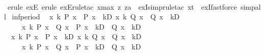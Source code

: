 \begin{isabellebody}
%
\isadelimproof
\ \ %
\endisadelimproof
%
\isatagproof
{}\isamarkupfalse%
\ {\isacharparenleft}{\kern0pt}{\isacharparenleft}{\kern0pt}erule\ exE{\isacharcomma}{\kern0pt}\ erule\ exE{\isacharcomma}{\kern0pt}rule{\isacharunderscore}{\kern0pt}tac\ x{\isacharequal}{\kern0pt}{\isachardoublequoteopen}max\ z\ za{\isachardoublequoteclose}\ \ exI{\isacharcomma}{\kern0pt}simp{\isacharparenright}{\kern0pt}{\isacharplus}{\kern0pt}{\isacharcomma}{\kern0pt}{\isacharparenleft}{\kern0pt}rule{\isacharunderscore}{\kern0pt}tac\ x{\isacharequal}{\kern0pt}{\isachardoublequoteopen}t{\isachardoublequoteclose}\ \ exI{\isacharcomma}{\kern0pt}fastforce{\isacharparenright}{\kern0pt}{\isacharplus}{\kern0pt}{\isacharparenright}{\kern0pt}\ simp{\isacharunderscore}{\kern0pt}all%
\endisatagproof
{\isafoldproof}%
%
\isadelimproof
\isanewline
%
\endisadelimproof
\isanewline
{}\isamarkupfalse%
\ inf{\isacharunderscore}{\kern0pt}period{\isacharcolon}{\kern0pt}\isanewline
\ \ {\isachardoublequoteopen}{\isasymlbrakk}{\isasymforall}x\ k{\isachardot}{\kern0pt}\ P\ x\ {\isacharequal}{\kern0pt}\ P\ {\isacharparenleft}{\kern0pt}x\ {\isacharminus}{\kern0pt}\ k{\isacharasterisk}{\kern0pt}D{\isacharparenright}{\kern0pt}{\isacharsemicolon}{\kern0pt}\ {\isasymforall}x\ k{\isachardot}{\kern0pt}\ Q\ x\ {\isacharequal}{\kern0pt}\ Q\ {\isacharparenleft}{\kern0pt}x\ {\isacharminus}{\kern0pt}\ k{\isacharasterisk}{\kern0pt}D{\isacharparenright}{\kern0pt}{\isasymrbrakk}\ \isanewline
\ \ \ \ {\isasymLongrightarrow}\ {\isasymforall}x\ k{\isachardot}{\kern0pt}\ {\isacharparenleft}{\kern0pt}P\ x\ {\isasymand}\ Q\ x{\isacharparenright}{\kern0pt}\ {\isacharequal}{\kern0pt}\ {\isacharparenleft}{\kern0pt}P\ {\isacharparenleft}{\kern0pt}x\ {\isacharminus}{\kern0pt}\ k{\isacharasterisk}{\kern0pt}D{\isacharparenright}{\kern0pt}\ {\isasymand}\ Q\ {\isacharparenleft}{\kern0pt}x\ {\isacharminus}{\kern0pt}\ k{\isacharasterisk}{\kern0pt}D{\isacharparenright}{\kern0pt}{\isacharparenright}{\kern0pt}{\isachardoublequoteclose}\isanewline
\ \ {\isachardoublequoteopen}{\isasymlbrakk}{\isasymforall}x\ k{\isachardot}{\kern0pt}\ P\ x\ {\isacharequal}{\kern0pt}\ P\ {\isacharparenleft}{\kern0pt}x\ {\isacharminus}{\kern0pt}\ k{\isacharasterisk}{\kern0pt}D{\isacharparenright}{\kern0pt}{\isacharsemicolon}{\kern0pt}\ {\isasymforall}x\ k{\isachardot}{\kern0pt}\ Q\ x\ {\isacharequal}{\kern0pt}\ Q\ {\isacharparenleft}{\kern0pt}x\ {\isacharminus}{\kern0pt}\ k{\isacharasterisk}{\kern0pt}D{\isacharparenright}{\kern0pt}{\isasymrbrakk}\ \isanewline
\ \ \ \ {\isasymLongrightarrow}\ {\isasymforall}x\ k{\isachardot}{\kern0pt}\ {\isacharparenleft}{\kern0pt}P\ x\ {\isasymor}\ Q\ x{\isacharparenright}{\kern0pt}\ {\isacharequal}{\kern0pt}\ {\isacharparenleft}{\kern0pt}P\ {\isacharparenleft}{\kern0pt}x\ {\isacharminus}{\kern0pt}\ k{\isacharasterisk}{\kern0pt}D{\isacharparenright}{\kern0pt}\ {\isasymor}\ Q\ {\isacharparenleft}{\kern0pt}x\ {\isacharminus}{\kern0pt}\ k{\isacharasterisk}{\kern0pt}D{\isacharparenright}{\kern0pt}{\isacharparenright}{\kern0pt}{\isachardoublequoteclose}\isanewline

\end{isabellebody}
